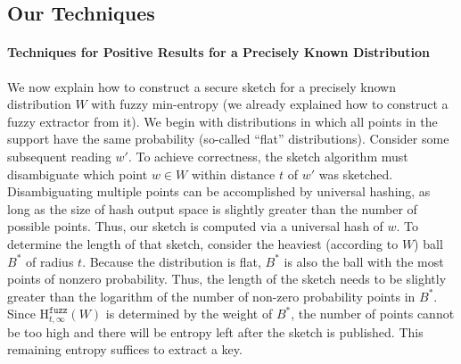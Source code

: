 \documentclass[11pt]{article}
\newcommand{\secref}[1]{\mbox{Section~\ref{#1}}}
\newcommand{\Hfuzz}{\mathrm{H}^{\mathtt{fuzz}}_{t,\infty}}
\begin{document}

\subsection{Our Techniques}

\paragraph{Techniques for Positive Results for a Precisely Known
  Distribution} 
We now explain how to construct a secure sketch for a precisely known
distribution $W$ with fuzzy min-entropy (we already explained how to
construct a fuzzy extractor from it).  We begin with distributions in
which all points in the support have the same probability (so-called
``flat'' distributions).  Consider some subsequent reading $w'$. To
achieve correctness, the sketch algorithm must disambiguate which
point $w\in W$ within distance $t$ of $w'$ was
sketched. Disambiguating multiple points can be accomplished by
universal hashing, as long as the size of hash output space is
slightly greater than the number of possible points. Thus, our sketch
is computed via a universal hash of $w$. To determine the length of
that sketch, consider the heaviest (according to $W$) ball $B^*$ of radius
$t$. Because the distribution is flat, $B^*$ is also the ball with the
most points of nonzero probability. Thus, the length of the sketch
needs to be slightly greater than the logarithm of the number of
non-zero probability points in $B^*$. Since $\Hfuzz(W)$ is
determined by the weight of $B^*$, the number of points cannot be
too high and there will be entropy left after the sketch is published.
%
This remaining entropy suffices to extract a key.
\end{document}
